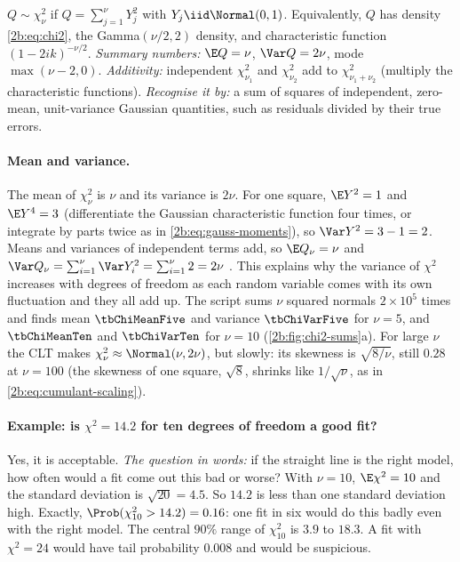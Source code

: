 \begin{workdef}
$Q\sim\chi^2_\nu$ if $Q=\sum_{j=1}^\nu Y_j^2$ with $Y_j\iid\Normal(0,1)$. Equivalently, $Q$ has density \eqref{2b:eq:chi2}, the Gamma$(\nu/2,2)$ density, and characteristic function $(1-2ik)^{-\nu/2}$.
\emph{Summary numbers:} $\E Q=\nu$, $\Var Q=2\nu$, mode $\max(\nu-2,0)$. \emph{Additivity:} independent $\chi^2_{\nu_1}$ and $\chi^2_{\nu_2}$ add to $\chi^2_{\nu_1+\nu_2}$ (multiply the characteristic functions).
\emph{Recognise it by:} a sum of squares of independent, zero-mean, unit-variance Gaussian quantities, such as residuals divided by their true errors.
\end{workdef}

\paragraph{Mean and variance.} The mean of $\chi^2_\nu$ is $\nu$ and its variance is $2\nu$. For one square, $\E Y^2=1$ and $\E Y^4=3$ (differentiate the Gaussian characteristic function four times, or integrate by parts twice as in \eqref{2b:eq:gauss-moments}), so $\Var Y^2=3-1=2$. Means and variances of independent terms add, so $\E Q_\nu=\nu$ and $\Var Q_\nu=\sum_{i=1}^{\nu}\Var Y_i^2=\sum_{i=1}^{\nu}2=2\nu$ . This explains why the variance of $\chi^2$ increases with degrees of freedom as each random variable comes with its own fluctuation and they all add up. The script sums $\nu$ squared normals $2\times10^5$ times and finds mean $\tbChiMeanFive$ and variance $\tbChiVarFive$ for $\nu=5$, and $\tbChiMeanTen$ and $\tbChiVarTen$ for $\nu=10$ (\cref{2b:fig:chi2-sums}a). For large $\nu$ the CLT makes $\chi^2_\nu\approx\Normal(\nu,2\nu)$, but slowly: its skewness is $\sqrt{8/\nu}$, still $0.28$ at $\nu=100$ (the skewness of one square, $\sqrt8$, shrinks like $1/\sqrt\nu$, as in \eqref{2b:eq:cumulant-scaling}).

\paragraph{Example: is $\chi^2=14.2$ for ten degrees of freedom a good fit?} Yes, it is acceptable. \emph{The question in words:} if the straight line is the right model, how often would a fit come out this bad or worse? With $\nu=10$, $\E\chi^2=10$ and the standard deviation is $\sqrt{20}=4.5$. So $14.2$ is less than one standard deviation high. Exactly, $\Prob(\chi^2_{10}>14.2)=0.16$: one fit in six would do this badly even with the right model. The central $90\%$ range of $\chi^2_{10}$ is $3.9$ to $18.3$. A fit with $\chi^2=24$ would have tail probability $0.008$ and would be suspicious.

